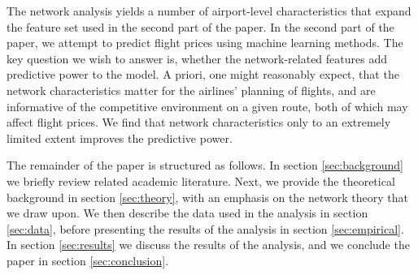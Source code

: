 \medskip

The network analysis yields a number of airport-level characteristics that expand the feature set used in the second part of the paper. In the second part of the paper, we attempt to predict flight prices using machine learning methods. The key question we wish to answer is, whether the network-related features add predictive power to the model. A priori, one might reasonably expect, that the network characteristics matter for the airlines' planning of flights, and are informative of the competitive environment on a given route, both of which may affect flight prices. We find that network characteristics only to an extremely limited extent improves the predictive power. 

\medskip
The remainder of the paper is structured as follows. In section \ref{sec:background} we briefly review related academic literature. Next, we provide the theoretical background in section \ref{sec:theory}, with an emphasis on the network theory that we draw upon. We then describe the data used in the analysis in section \ref{sec:data}, before presenting the results of the analysis in section \ref{sec:empirical}. In section \ref{sec:results} we discuss the results of the analysis, and we conclude the paper in section \ref{sec:conclusion}.
